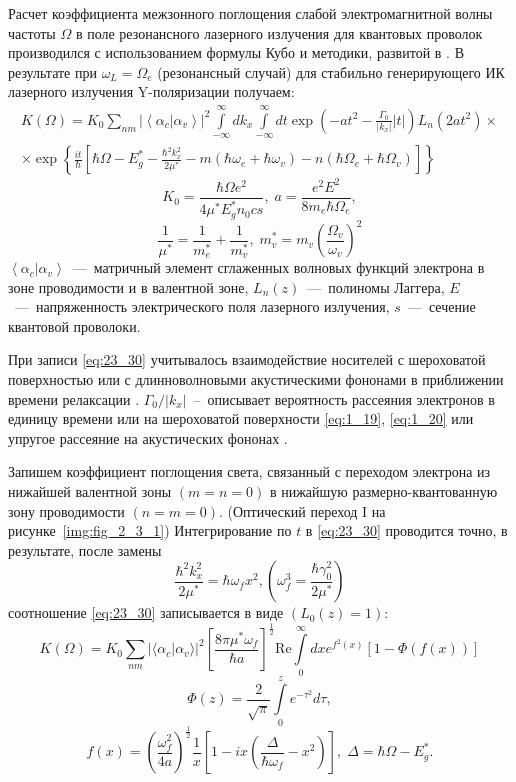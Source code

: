 Расчет коэффициента межзонного поглощения слабой электромагнитной волны частоты $\Omega$ в поле резонансного лазерного излучения для квантовых проволок производился с использованием формулы Кубо \cite{Kubo1957a} и методики, развитой в \cite{Sinyavskii1974}. В результате при $\omega_L = \Omega_e$ (резонансный случай) для стабильно генерирующего ИК лазерного излучения Y-поляризации получаем:
\begin{multline} \label{eq:23_30}
K\left(\Omega\right)=K_0{\sum_{nm}{\left|\left\langle \alpha_c | \alpha_v \right\rangle \right|}}^2 
\int\limits_{-\infty }^{\infty }dk_x \int\limits_{-\infty }^{\infty }{dt \exp{\left( -a t^2 -\frac{\Gamma_0 }{\left|k_x\right|}|t| \right) }} L_n\left(2at^2 \right)\times\\
\times {\exp \left\{\frac{it}{\hbar }\left[\hbar \Omega-E^*_g-\frac{\hbar^2 k^2_x}{2\mu^*}-m\left(\hbar\omega_e+\hbar\omega_v\right)-n\left(\hbar\Omega_e + \hbar\Omega_v \right)\right]\right\}\ }
\end{multline}
\[
K_0=\frac{\hbar \Omega e^2}{4\mu^* E_g^* n_0 c s}, \;
a=\frac{e^2 E^2}{8 m_e \hbar\Omega_e},
\]
\[
\frac{1}{\mu^*}=\frac{1}{m^*_e}+\frac{1}{m^*_v},\;
m^*_v=m_v {\left(\frac{\Omega_v}{\omega_v}\right)}^2
\] 
$\left\langle \alpha_c | \alpha_v \right\rangle $~---~матричный элемент сглаженных волновых функций электрона в зоне проводимости и в валентной зоне, $L_n\left(z\right)$~---~полиномы Лаггера, $E$~---~напряженность электрического поля лазерного излучения, $s$~---~сечение квантовой проволоки. 

При записи \eqref{eq:23_30} учитывалось взаимодействие носителей с шероховатой поверхностью или с длинноволновыми акустическими фононами в приближении времени релаксации \cite{Khamidullin2002}. ${\Gamma_0}/{\left|k_x\right|}$~--~описывает вероятность рассеяния электронов в единицу времени или на шероховатой поверхности \eqref{eq:1_19}, \eqref{eq:1_20}  или упругое рассеяние на акустических фононах \cite{Khamidullin2006}.

Запишем коэффициент поглощения света, связанный с переходом электрона из нижайшей валентной зоны $(m=n=0)$ в нижайшую размерно-квантованную зону проводимости $(n=m=0)$. (Оптический переход I на рисунке~\ref{img:fig_2_3_1}) Интегрирование по $t$ в  \eqref{eq:23_30} проводится точно, в результате, после замены
\[
\frac{{\hbar }^2 k^2_x}{2\mu^*}=\hbar {\omega }_fx^2, \left({\omega }^3_f = \frac{\hbar {\gamma }^2_0}{2\mu^*}\right)
\] 
соотношение  \eqref{eq:23_30} записывается в виде $\left(L_0\left(z\right)=1\right)$:
\begin{equation} \label{eq:23_40}
K\left(\Omega\right)=K_0\sum_{nm}{ {\lvert\langle \alpha_c | \alpha_v \rangle\rvert}^2 {\left[\frac{8\pi \mu^*\omega_f}{\hbar a}\right]}^{\frac{1}{2}} \mathrm{Re} \int\limits_0^\infty {dx e^{f^2\left(x\right)}\left[1-\Phi \left(f\left(x\right)\right)\right]}}
\end{equation}
\[
\Phi \left(z\right)=\frac{2}{\sqrt{\pi}}\int\limits_0^z {e^{-\tau^2}}d\tau ,
\] 
\[
f\left(x\right)={\left(\frac{\omega^2_f}{4a}\right)}^{\frac{1}{2}}\frac{1}{x}\left[1-ix\left(\frac{\Delta }{\hbar \omega_f}-x^2\right)\right],\; \Delta =\hbar \Omega-E^*_g .
\] 

